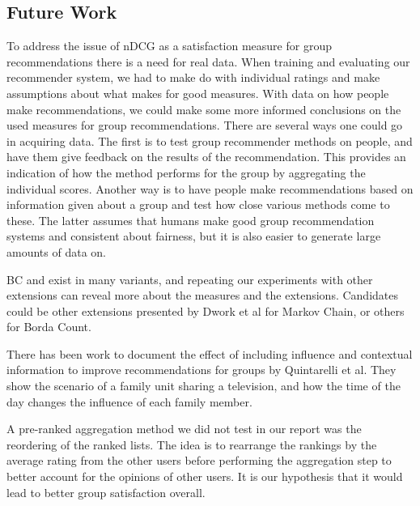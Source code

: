 \subsection{Future Work}\label{sec:futurework}

To address the issue of nDCG as a satisfaction measure for group recommendations there is a need for real data. When training and evaluating our recommender system, we had to make do with individual ratings and make assumptions about what makes for good measures. With data on how people make recommendations, we could make some more informed conclusions on the used measures for group recommendations. There are several ways one could go in acquiring data. The first is to test group recommender methods on people, and have them give feedback on the results of the recommendation. This provides an indication of how the method performs for the group by aggregating the individual scores. Another way is to have people make recommendations based on information given about a group and test how close various methods come to these. The latter assumes that humans make good group recommendation systems and consistent about fairness, but it is also easier to generate large amounts of data on.

BC and \MC exist in many variants, and repeating our experiments with other extensions can reveal more about the measures and the extensions. Candidates could be other extensions presented by Dwork et al\cite{rank:aggregation} for Markov Chain, or others for Borda Count.


There has been work to document the effect of including influence and contextual information to improve recommendations for groups by Quintarelli et al\cite{Quintarelli2016}. They show the scenario of a family unit sharing a television, and how the time of the day changes the influence of each family member.


A pre-ranked aggregation method we did not test in our report was the reordering of the ranked lists.
The idea is to rearrange the rankings by the average rating from the other users before performing the aggregation step to better account for the opinions of other users. It is our hypothesis that it would lead to better group satisfaction overall.
